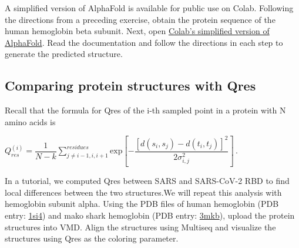 A simplified version of AlphaFold is available for public use on Colab. Following the directions from a preceding exercise, obtain the protein sequence of the human hemoglobin beta subunit. Next, open \href{https://colab.research.google.com/github/deepmind/alphafold/blob/main/notebooks/AlphaFold.ipynb#scrollTo=woIxeCPygt7K}{Colab's simplified version of AlphaFold}. Read the documentation and follow the directions in each step to generate the predicted structure.\\

\begin{exercise}\end{exercise}


\subsection{Comparing protein structures with Qres}

Recall that the formula for Qres of the i-th sampled point in a protein with N amino acids is

\begin{center}
$Q_{res}^{(i)} = \dfrac{1}{N-k} \sum^{residues}_{j\neq i-1,i,i+1} \textrm{exp}[-\dfrac{[d(s_i,s_j)-d(t_i,t_j)]^2}{2\sigma^2_{i,j}}]\, .$
\end{center}

\begin{exercise}\end{exercise}

In a tutorial, we computed Qres between SARS and SARS-CoV-2 RBD to find local differences between the two structures. We will repeat this analysis with hemoglobin subunit alpha. Using the PDB files of human hemoglobin (PDB entry: \href{https://www.rcsb.org/structure/1si4}{1si4}) and mako shark hemoglobin (PDB entry: \href{https://www.rcsb.org/structure/3mkb}{3mkb}), upload the protein structures into VMD. Align the structures using Multiseq and visualize the structures using Qres as the coloring parameter.\\

\begin{exercise}\end{exercise}


